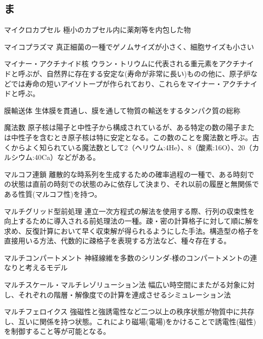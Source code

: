 \begin{用語集}
\section{ま}
\item{マイクロカプセル}{}
{極小のカプセル内に薬剤等を内包した物}
\item{マイコプラズマ}{}
{真正細菌の一種でゲノムサイズが小さく、細胞サイズも小さい}
\item{マイナー・アクチナイド核}{}
{ウラン・トリウムに代表される重元素をアクチナイドと呼ぶが、自然界に存在する安定な(寿命が非常に長い)ものの他に、原子炉などでは寿命の短いアイソトープが作られており、これらをマイナー・アクチナイドと呼ぶ。}
\item{膜輸送体}{}
{生体膜を貫通し、膜を通して物質の輸送をするタンパク質の総称}
\item{魔法数}{}
{原子核は陽子と中性子から構成されているが、ある特定の数の陽子または中性子を含むとき原子核は特に安定となる。この数のことを魔法数と呼ぶ。古くからよく知られている魔法数として2（ヘリウム:4He）、8（酸素:16O）、20（カルシウム:40Ca）などがある。}
\item{マルコフ連鎖}{}
{離散的な時系列を生成するための確率過程の一種で、ある時刻での状態は直前の時刻での状態のみに依存して決まり、それ以前の履歴と無関係である性質(マルコフ性)を持つ。}
\item{マルチグリッド型前処理}{}
{連立一次方程式の解法を使用する際、行列の収束性を向上するために導入される前処理法の一種。疎・密の計算格子に対して順に解を求め、反復計算において早く収束解が得られるようにした手法。構造型の格子を直接用いる方法、代数的に疎格子を表現する方法など、種々存在する。}
\item{マルチコンパートメント}{}
{神経線維を多数のシリンダ-様のコンパートメントの連なりと考えるモデル}
\item{マルチスケール・マルチレゾリューション法}{}
{幅広い時空間にまたがる対象に対し、それぞれの階層・解像度での計算を連成させるシミュレーション法}
\item{マルチフェロイクス}{}
{強磁性と強誘電性など二つ以上の秩序状態が物質中に共存し、互いに関係を持つ状態。これにより磁場(電場)をかけることで誘電性(磁性)を制御すること等が可能となる。}

\end{用語集}
